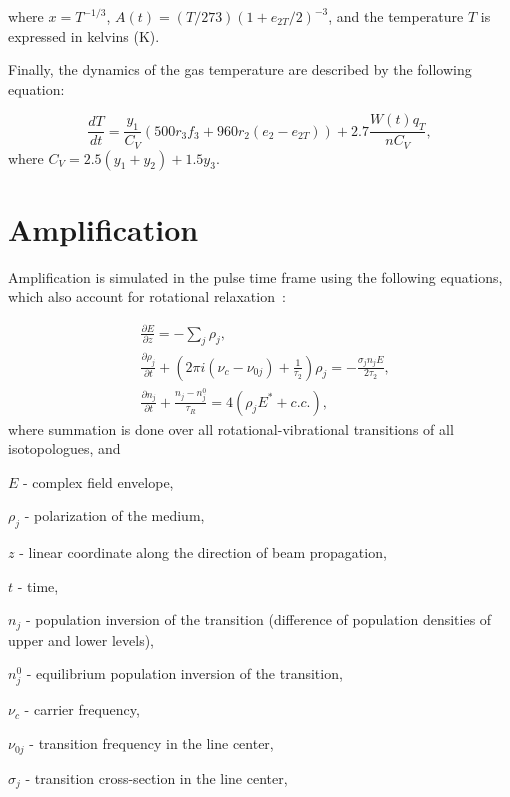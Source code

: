 where \( x=T^{-1/3} \), \( A(t)=(T/273)(1+e_{2T}/2)^{-3} \), and the temperature \( T \) is expressed in kelvins (K).

Finally, the dynamics of the gas temperature are described by the following equation:

\begin{equation}\label{eq:dTdt}
\frac{dT}{dt} = \frac{y_1}{C_V}(500r_3f_3 + 960r_2(e_2-e_{2T})) + 2.7\frac{W(t)q_T}{nC_V},
\end{equation}
where \( C_V = 2.5(y_1+y_2) + 1.5y_3 \).



\section{Amplification}\label{section:amplification}

Amplification is simulated in the pulse time frame using the following equations, which also account for rotational relaxation~\cite{Feldman-1973, Volkin-1979}:

\begin{equation}\label{eq:amplification}
\begin{aligned}
&\frac{\partial E}{\partial z} =  - \sum\limits_j {\rho _j},\\
&\frac{\partial \rho _j}{\partial t} + \left(2\pi i(\nu _c-\nu _{0j}) + \frac{1}{\tau_2} \right)\rho _j =  - \frac{\sigma _j n_j E}{2\tau_2},\\
&\frac{\partial n_j}{\partial t} + \frac{n_j-n_j^0}{\tau _R} = 4(\rho _j E^* + c.c.),
\end{aligned}
\end{equation}
where summation is done over all rotational-vibrational transitions of all  isotopologues, and

$E$ - complex field envelope,

$\rho_j$ - polarization of the medium,

$z$ - linear coordinate along the direction of beam propagation,

$t$ - time,

$n_j$ - population inversion of the transition (difference of population densities of upper and lower levels),

$n_j^0$ - equilibrium population inversion of the transition,

$\nu _c$ - carrier frequency,

$\nu_{0j}$ - transition frequency in the line center,

$\sigma_j$ - transition cross-section in the line center,

